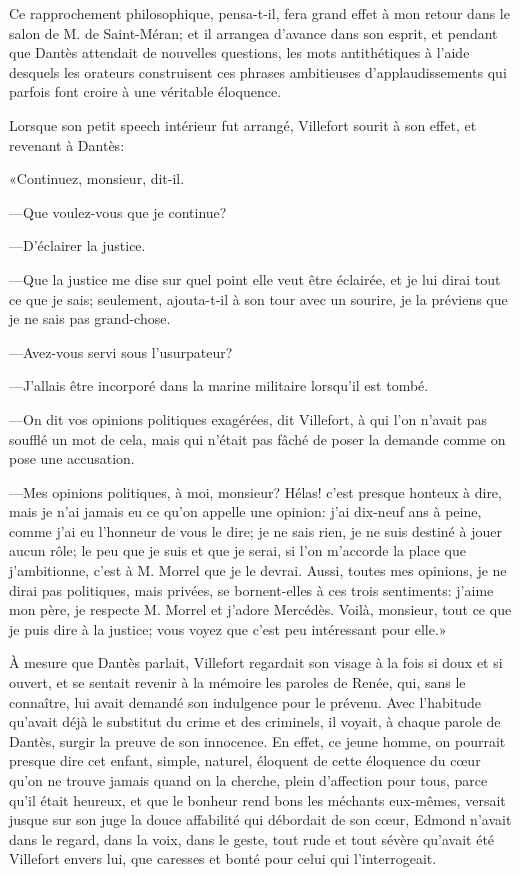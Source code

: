 Ce rapprochement philosophique, pensa-t-il, fera grand effet à mon retour dans le salon de M. de Saint-Méran; et il arrangea d'avance dans son esprit, et pendant que Dantès attendait de nouvelles questions, les mots antithétiques à l'aide desquels les orateurs construisent ces phrases ambitieuses d'applaudissements qui parfois font croire à une véritable éloquence.

Lorsque son petit speech intérieur fut arrangé, Villefort sourit à son effet, et revenant à Dantès:

«Continuez, monsieur, dit-il.

—Que voulez-vous que je continue?

—D'éclairer la justice.

—Que la justice me dise sur quel point elle veut être éclairée, et je lui dirai tout ce que je sais; seulement, ajouta-t-il à son tour avec un sourire, je la préviens que je ne sais pas grand-chose.

—Avez-vous servi sous l'usurpateur?

—J'allais être incorporé dans la marine militaire lorsqu'il est tombé.

—On dit vos opinions politiques exagérées, dit Villefort, à qui l'on n'avait pas soufflé un mot de cela, mais qui n'était pas fâché de poser la demande comme on pose une accusation.

—Mes opinions politiques, à moi, monsieur? Hélas! c'est presque honteux à dire, mais je n'ai jamais eu ce qu'on appelle une opinion: j'ai dix-neuf ans à peine, comme j'ai eu l'honneur de vous le dire; je ne sais rien, je ne suis destiné à jouer aucun rôle; le peu que je suis et que je serai, si l'on m'accorde la place que j'ambitionne, c'est à M. Morrel que je le devrai. Aussi, toutes mes opinions, je ne dirai pas politiques, mais privées, se bornent-elles à ces trois sentiments: j'aime mon père, je respecte M. Morrel et j'adore Mercédès. Voilà, monsieur, tout ce que je puis dire à la justice; vous voyez que c'est peu intéressant pour elle.»

À mesure que Dantès parlait, Villefort regardait son visage à la fois si doux et si ouvert, et se sentait revenir à la mémoire les paroles de Renée, qui, sans le connaître, lui avait demandé son indulgence pour le prévenu. Avec l'habitude qu'avait déjà le substitut du crime et des criminels, il voyait, à chaque parole de Dantès, surgir la preuve de son innocence. En effet, ce jeune homme, on pourrait presque dire cet enfant, simple, naturel, éloquent de cette éloquence du cœur qu'on ne trouve jamais quand on la cherche, plein d'affection pour tous, parce qu'il était heureux, et que le bonheur rend bons les méchants eux-mêmes, versait jusque sur son juge la douce affabilité qui débordait de son cœur, Edmond n'avait dans le regard, dans la voix, dans le geste, tout rude et tout sévère qu'avait été Villefort envers lui, que caresses et bonté pour celui qui l'interrogeait.

